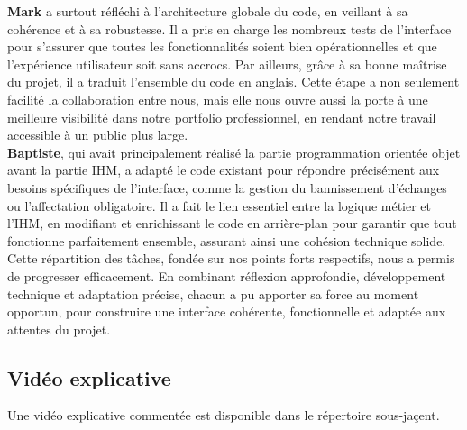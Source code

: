 \documentclass{mytex}
\begin{document}
\textbf{Mark} a surtout réfléchi à l’architecture globale du code, en veillant à sa cohérence et à sa robustesse. Il a pris en charge les nombreux tests de l’interface pour s’assurer que toutes les fonctionnalités soient bien opérationnelles et que l’expérience utilisateur soit sans accrocs. Par ailleurs, grâce à sa bonne maîtrise du projet, il a traduit l’ensemble du code en anglais. Cette étape a non seulement facilité la collaboration entre nous, mais elle nous ouvre aussi la porte à une meilleure visibilité dans notre portfolio professionnel, en rendant notre travail accessible à un public plus large. \\

\textbf{Baptiste}, qui avait principalement réalisé la partie programmation orientée objet avant la partie IHM, a adapté le code existant pour répondre précisément aux besoins spécifiques de l’interface, comme la gestion du bannissement d’échanges ou l’affectation obligatoire. Il a fait le lien essentiel entre la logique métier et l’IHM, en modifiant et enrichissant le code en arrière-plan pour garantir que tout fonctionne parfaitement ensemble, assurant ainsi une cohésion technique solide. \\

Cette répartition des tâches, fondée sur nos points forts respectifs, nous a permis de progresser efficacement. En combinant réflexion approfondie, développement technique et adaptation précise, chacun a pu apporter sa force au moment opportun, pour construire une interface cohérente, fonctionnelle et adaptée aux attentes du projet.



\subsection{Vidéo explicative}

Une vidéo explicative commentée est disponible dans le répertoire sous-jaçent.
\end{document}
